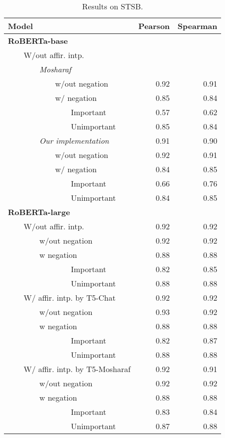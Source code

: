
\begin{table*}
\centering
\begin{tabular}{lrr}
\toprule
Model & Pearson & Spearman \\
\midrule
\textbf{RoBERTa-base} \\
~~~~W/out affir. intp. \\
~~~~~~~~\textit{Mosharaf} \\
~~~~~~~~~~~~w/out negation &0.92&0.91\\ 
~~~~~~~~~~~~w/ negation &0.85&0.84\\ 
~~~~~~~~~~~~~~~~Important &0.57&0.62\\ 
~~~~~~~~~~~~~~~~Unimportant &0.85&0.84\\ 
\midrule
~~~~~~~~\textit{Our implementation}  & 0.91 & 0.90  \\ 
~~~~~~~~~~~~w/out negation  & 0.92 & 0.91   \\ 
~~~~~~~~~~~~w/ negation  & 0.84 & 0.85  \\
~~~~~~~~~~~~~~~~Important  & 0.66 & 0.76  \\
~~~~~~~~~~~~~~~~Unimportant  & 0.84 & 0.85  \\  
\bottomrule
\textbf{RoBERTa-large} \\
~~~~W/out affir. intp.  & 0.92 & 0.92\\
~~~~~~~~w/out negation  & 0.92 & 0.92 \\ 
~~~~~~~~w negation  & 0.88 & 0.88\\ 
~~~~~~~~~~~~~~~~Important  & 0.82 & 0.85\\ 
~~~~~~~~~~~~~~~~Unimportant  & 0.88 & 0.88\\ 
\midrule
~~~~W/ affir. intp. by T5-Chat  & 0.92 & 0.92 \\
~~~~~~~~w/out negation   & 0.93 & 0.92 \\ 
~~~~~~~~w negation  & 0.88 & 0.88\\ 
~~~~~~~~~~~~~~~~Important  & 0.82 & 0.87\\ 
~~~~~~~~~~~~~~~~Unimportant  & 0.88 & 0.88\\ 
\midrule
~~~~W/ affir. intp. by T5-Mosharaf  & 0.92 & 0.91  \\
~~~~~~~~w/out negation  & 0.92 & 0.92  \\
~~~~~~~~w negation   & 0.88 & 0.88  \\ 
~~~~~~~~~~~~~~~~Important  & 0.83 & 0.84  \\ 
~~~~~~~~~~~~~~~~Unimportant  & 0.87 & 0.88 \\ 
\bottomrule
\end{tabular}
\caption{Results on STSB.}
\end{table*}